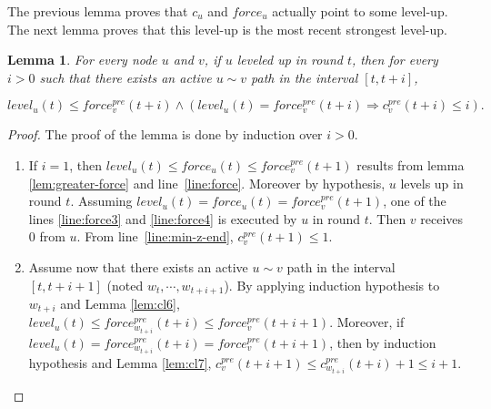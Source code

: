 \documentclass[11pt,letterpaper]{article}
\newtheorem{lem}[thm]{Lemma}
\begin{document}
The previous lemma proves that $c_u$ and $force_u$ actually point to some level-up.
The next lemma proves that this level-up is the most recent strongest level-up.
\begin{lem} \label{lem:strongest}
	For every node $u$ and $v$, if $u$ leveled up in round $t$,
	then for every $i > 0$ such that there exists an active $u \sim v$ path in the interval $[t,t+i]$,

	$$level_u(t) \leq force_v^{pre}(t+i) \wedge (level_u(t) = force_v^{pre}(t+i) \Rightarrow c^{pre}_v(t+i) \leq i).$$

\end{lem}
\begin{proof}
	\noindent The proof of the lemma is done by induction over $i > 0$.
	\begin{enumerate}
		\item If $i = 1$, then $level_u(t) \leq force_u(t) \leq force_v^{pre}(t+1)$ results from lemma \ref{lem:greater-force} and line~\ref{line:force}.
			Moreover by hypothesis, $u$ levels up in round $t$.
			Assuming $level_u(t) = force_u(t) = force_v^{pre}(t+1)$, one of the lines \ref{line:force3} and \ref{line:force4} is executed by $u$ in round $t$.
			Then $v$ receives 0 from $u$. From line~\ref{line:min-z-end}, $c^{pre}_v(t+1) \leq 1$.
		\item Assume now that there exists an active $u \sim v$ path in the interval $[t,t+i+1]$ (noted $w_t, \cdots, w_{t+i+1}$).
			By applying induction hypothesis to $w_{t+i}$ and Lemma \ref{lem:cl6}, $level_u(t) \leq force_{w_{t+i}}^{pre}(t+i) \leq force_v^{pre}(t+i+1)$.
			Moreover, if $level_u(t) = force_{w_{t+i}}^{pre}(t+i) = force_v^{pre}(t+i+1)$,
			then by induction hypothesis and Lemma \ref{lem:cl7}, $c^{pre}_v(t+i+1) \leq c_{w_{t+i}}^{pre}(t+i) + 1 \leq i + 1$.
	\end{enumerate}
\end{proof}
\end{document}
